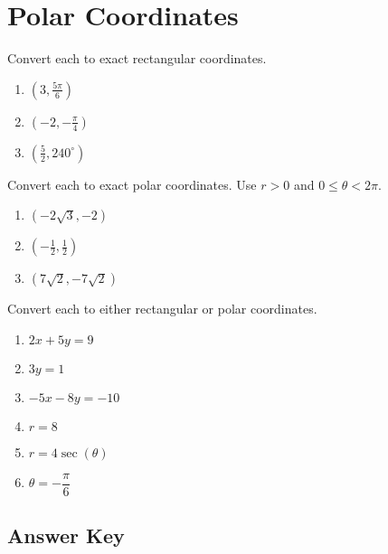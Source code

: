 \chapter{Polar Coordinates}

Convert each to exact rectangular coordinates.
\begin{enumerate}
	\item $\left(3, \frac{5\pi}{6}\right)$
    \item $\left(-2, -\frac{\pi}{4}\right)$
    \item $\left(\frac{5}{2}, 240^\circ\right)$
\end{enumerate}	\setcounter{Review}{\value{enumi}}

Convert each to exact polar coordinates. Use $r > 0$ and $0 \leq \theta < 2\pi$.
\begin{enumerate}		\setcounter{enumi}{\value{Review}}
	\item $\left(-2\sqrt{3}, -2\right)$
    \item $\left(-\frac{1}{2}, \frac{1}{2}\right)$
    \item $\left(7\sqrt{2}, -7\sqrt{2}\right)$
\end{enumerate}	\setcounter{Review}{\value{enumi}}

Convert each to either rectangular or polar coordinates.
\begin{enumerate}		\setcounter{enumi}{\value{Review}}
	\item $2x + 5y = 9$
    \item $3y = 1$
    \item $-5x - 8y = -10$
    \item $r = 8$
    \item $r = 4\sec(\theta)$
    \item $\theta = -\dfrac{\pi}{6}$
\end{enumerate}	\setcounter{Review}{\value{enumi}}

\newpage

\section{Answer Key}

